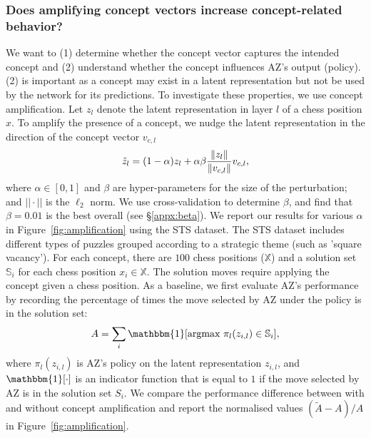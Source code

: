 \documentclass{article}
\def\Xset{\mathbb{X}}
\def\vcl{v_{c,l}}
\begin{document}
\subsubsection{Does amplifying concept vectors increase concept-related behavior?} \label{res:concept_amplification}
We want to (1) determine whether the concept vector captures the intended concept and (2) understand whether the concept influences AZ's output (policy). (2) is important as a concept may exist in a latent representation but not be used by the network for its predictions. To investigate these properties, we use concept amplification.
Let $z_{l}$ denote the latent representation in layer $l$ of a chess position $x$. 
To amplify the presence of a concept, we nudge the latent representation in the direction of the concept vector $\vcl$
\begin{equation} \label{eq: concept_amplify}
    \Tilde{z}_{l} = (1-\alpha)z_{l} + \alpha \beta \frac{\| z_{l} \|}{
    \| \vcl \|} \vcl, 
\end{equation}
where $\alpha \in [0,1]$ and $\beta$ are hyper-parameters for 
the size of the perturbation; and $||\cdot||$ is the $\ell_2$ norm. We use cross-validation to determine $\beta$, and find that $\beta = 0.01$ is the best overall (see \S\ref{appx:beta}).
We report our results for various $\alpha$ in Figure~\ref{fig:amplification} using the 
STS dataset. The STS dataset includes different types of puzzles grouped according to a strategic theme (such as 'square vacancy'). For each concept, there are $100$ chess positions ($\Xset$) and a solution set $\mathbb{S}_i$ for each chess position $x_i \in \Xset$. 
The solution moves require applying the concept given a chess position. 
As a baseline, we first evaluate AZ's performance by recording the percentage of times the move selected by AZ under the policy is in the solution set:
\begin{equation}
    A = \sum_i \mathbbm{1} [\text{argmax} \ \pi_l(z_{i,l}) \in \mathbb{S}_i],
\end{equation}
where $\pi_l(z_{i,l})$ is AZ's policy on the latent representation $z_{i,l}$, and $\mathbbm{1}[\cdot]$ is an indicator function that is equal to $1$ if the move selected by AZ is in the solution set $S_i$. 
We compare the performance difference between with and without concept amplification and report the normalised values $(\tilde{A}-A)/A$ in Figure~\ref{fig:amplification}.
 
\end{document}
